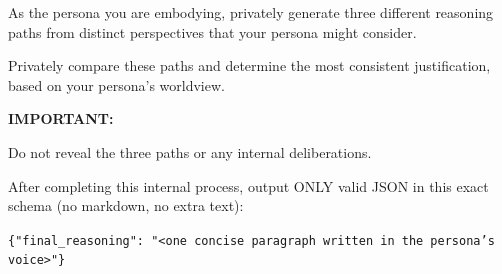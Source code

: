 \begin{tcolorbox}[
  enhanced jigsaw,
  breakable,
  colback=blue!5!white,
  colframe=blue!75!black,
  title={Self Consistency Prompt},
  rounded corners
]
\noindent
As the persona you are embodying, privately generate three different reasoning paths from distinct perspectives that your persona might consider.

\vspace{0.5em}

\noindent
Privately compare these paths and determine the most consistent justification, based on your persona's worldview.

\vspace{1em}

\noindent
\textbf{IMPORTANT:}

\vspace{0.5em}

\noindent
Do not reveal the three paths or any internal deliberations.

\vspace{0.5em}

\noindent
After completing this internal process, output ONLY valid JSON in this exact schema (no markdown, no extra text):

\vspace{1em}

\noindent
\texttt{\{"final\_reasoning": "\textless{}one concise paragraph written in the persona's voice\textgreater{}"\}}
\end{tcolorbox}
\noindent\begin{minipage}{\textwidth}
 \label{self_consistency_strategy}
\end{minipage}

